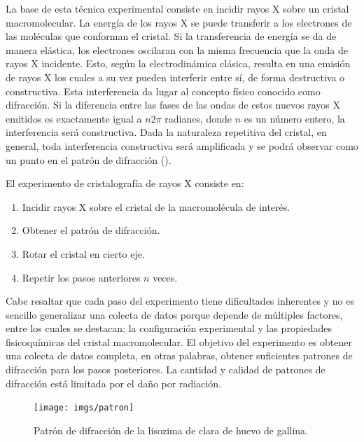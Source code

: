 La base de esta técnica experimental consiste en incidir rayos X sobre un cristal macromolecular. La energía de los rayos X se puede transferir a los electrones de las moléculas que conforman el cristal. Si la transferencia de energía se da de manera elástica, los electrones oscilaran con la misma frecuencia que la onda de rayos X incidente. Esto, según la electrodinámica clásica, resulta en una emisión de rayos X los cuales a su vez pueden interferir entre sí, de forma destructiva o constructiva. Esta interferencia da lugar al concepto físico conocido como difracción. Si la diferencia entre las fases de las ondas de estos nuevos rayos X emitidos es exactamente igual a $n2\pi$ radianes, donde $n$ es un número entero, la interferencia será constructiva. Dada la naturaleza repetitiva del cristal, en general, toda interferencia constructiva será amplificada y se podrá observar como un punto en el patrón de difracción ().

El experimento de cristalografía de rayos X consiste en:

\begin{enumerate}
	\item Incidir rayos X sobre el cristal de la macromolécula de interés. 
	\item Obtener el patrón de difracción. 
	\item Rotar el cristal en cierto eje. 
	\item Repetir los pasos anteriores $n$ veces.
\end{enumerate}

Cabe resaltar que cada paso del experimento tiene dificultades inherentes y no es sencillo generalizar una colecta de datos porque  depende de múltiples factores, entre los cuales se destacan: la configuración experimental y las propiedades fisicoquímicas del cristal macromolecular. El objetivo del experimento es obtener una colecta de datos completa, en otras palabras, obtener suficientes patrones de difracción para los pasos posteriores. La cantidad y calidad de patrones de difracción está limitada por el daño por radiación.

\begin{figure}[h]
	\texttt{[image: imgs/patron]}
	\caption[Patrón de difracción]{Patrón de difracción de la lisozima de clara de huevo de gallina.}
\end{figure}

